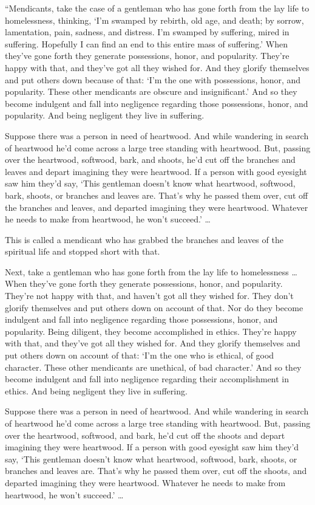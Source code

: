 \documentclass[12pt,openany]{book}%
\begin{document}
“Mendicants, take the case of a gentleman who has gone forth from the lay life to homelessness, thinking, ‘I’m swamped by rebirth, old age, and death; by sorrow, lamentation, pain, sadness, and distress. I’m swamped by suffering, mired in suffering. Hopefully I can find an end to this entire mass of suffering.’ When they’ve gone forth they generate possessions, honor, and popularity. They’re happy with that, and they’ve got all they wished for. And they glorify themselves and put others down because of that: ‘I’m the one with possessions, honor, and popularity. These other mendicants are obscure and insignificant.’ And so they become indulgent and fall into negligence regarding those possessions, honor, and popularity. And being negligent they live in suffering. 

Suppose there was a person in need of heartwood. And while wandering in search of heartwood he’d come across a large tree standing with heartwood. But, passing over the heartwood, softwood, bark, and shoots, he’d cut off the branches and leaves and depart imagining they were heartwood. If a person with good eyesight saw him they’d say, ‘This gentleman doesn’t know what heartwood, softwood, bark, shoots, or branches and leaves are. That’s why he passed them over, cut off the branches and leaves, and departed imagining they were heartwood. Whatever he needs to make from heartwood, he won’t succeed.’ … 

This is called a mendicant who has grabbed the branches and leaves of the spiritual life and stopped short with that. 

Next, take a gentleman who has gone forth from the lay life to homelessness … When they’ve gone forth they generate possessions, honor, and popularity. They’re not happy with that, and haven’t got all they wished for. They don’t glorify themselves and put others down on account of that. Nor do they become indulgent and fall into negligence regarding those possessions, honor, and popularity. Being diligent, they become accomplished in ethics. They’re happy with that, and they’ve got all they wished for. And they glorify themselves and put others down on account of that: ‘I’m the one who is ethical, of good character. These other mendicants are unethical, of bad character.’ And so they become indulgent and fall into negligence regarding their accomplishment in ethics. And being negligent they live in suffering. 

Suppose there was a person in need of heartwood. And while wandering in search of heartwood he’d come across a large tree standing with heartwood. But, passing over the heartwood, softwood, and bark, he’d cut off the shoots and depart imagining they were heartwood. If a person with good eyesight saw him they’d say, ‘This gentleman doesn’t know what heartwood, softwood, bark, shoots, or branches and leaves are. That’s why he passed them over, cut off the shoots, and departed imagining they were heartwood. Whatever he needs to make from heartwood, he won’t succeed.’ … 
\end{document}
